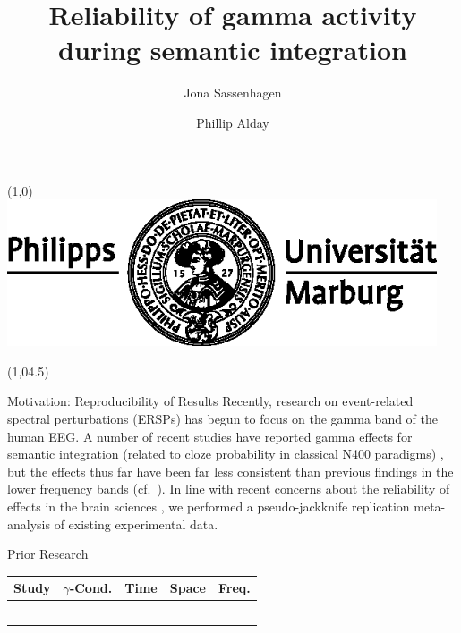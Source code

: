 \documentclass[final]{beamer}
\title{Reliability of gamma activity during semantic integration}
\author{Jona Sassenhagen \and Phillip Alday}
\institute{University of Marburg}
\date{}
\newcommand{\subblock}[1]{\bigskip\textbf{#1}}
\begin{document}
\begin{frame}{} 	
\begin{textblock}{15}(1,0)
\includegraphics[width=5in]{marburg-logo-blackwhite.eps}
\end{textblock}


\begin{textblock}{45}(1,04.5)
\begin{block}{Motivation: Reproducibility of Results}
Recently, research on event-related spectral perturbations (ERSPs) has begun to focus on the gamma band of the human EEG. A number of recent studies have reported gamma effects for semantic integration (related to cloze probability in classical N400 paradigms) \cite{mellemfriedmanmedvedev2013a,wangzhubastiaansen2012a,penolazziangrillijob2009a,hagoort2008a,hagoorthaldbastiaansen2004a}, but the effects thus far have been far less consistent than previous findings in the lower frequency bands (cf.~\cite{bastiaansenhagoort2006a,heinetammhofmann2006a,rohmklimeschhaider2001a,davidsonindefrey2007a,roehmschlesewskybornkessel2004a}).
In line with recent concerns about the reliability of effects in the brain sciences \cite{vulharriswinkielman2009a,simmonsnelsonsimonsohn2011a,kilner2013a}, we performed a pseudo-jackknife replication meta-analysis of existing experimental data. 
\end{block}

\begin{block}{Prior Research}
\begin{tabular}{p{10cm} l c c c }
Study & $\gamma$-Cond. & Time  & Space & Freq. \\
\midrule
\cite{mellemfriedmanmedvedev2013a} & & & &\\
\cite{wangzhubastiaansen2012a} & & & & \\
\cite{penolazziangrillijob2009a} & & & &\\ 
\cite{hagoort2008a} & & & & \\
\cite{hagoorthaldbastiaansen2004a} & & & & \\
\end{tabular}
\end{block}


\end{textblock}
\end{frame}
\end{document}
